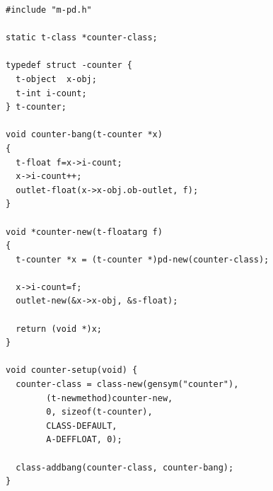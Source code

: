 \documentclass[draft]{ppgmus}
\begin{document}
\begin{verbatim}
#include "m-pd.h"

static t-class *counter-class;

typedef struct -counter {
  t-object  x-obj;
  t-int i-count;
} t-counter;

void counter-bang(t-counter *x)
{
  t-float f=x->i-count;
  x->i-count++;
  outlet-float(x->x-obj.ob-outlet, f);
}

void *counter-new(t-floatarg f)
{
  t-counter *x = (t-counter *)pd-new(counter-class);

  x->i-count=f;
  outlet-new(&x->x-obj, &s-float);

  return (void *)x;
}

void counter-setup(void) {
  counter-class = class-new(gensym("counter"),
        (t-newmethod)counter-new,
        0, sizeof(t-counter),
        CLASS-DEFAULT,
        A-DEFFLOAT, 0);

  class-addbang(counter-class, counter-bang);
}
\end{verbatim}
\end{document}
